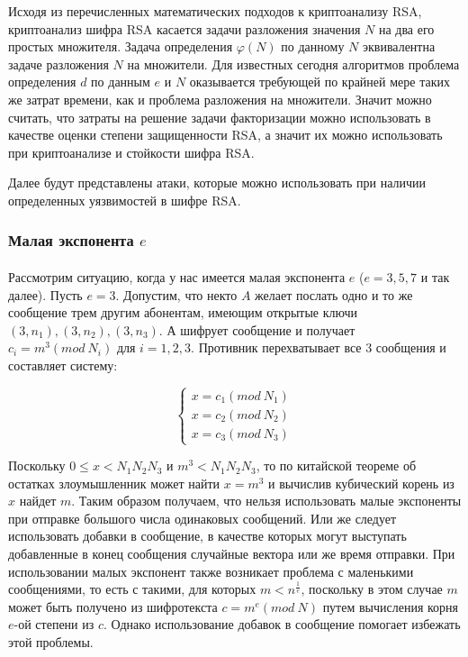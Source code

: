   Исходя из перечисленных математических подходов к криптоанализу RSA, криптоанализ шифра RSA касается задачи разложения значения $N$ на два его простых множителя. 
  Задача определения $\varphi(N)$ по данному $N$ эквивалентна задаче разложения $N$ на множители. Для известных сегодня алгоритмов
  проблема определения $d$ по данным $e$ и $N$ оказывается требующей по крайней мере таких же затрат времени, как и проблема разложения на 
  множители. Значит можно считать, что затраты на решение задачи факторизации можно использовать в качестве оценки степени защищенности RSA, а значит их можно использовать 
  при криптоанализе и стойкости шифра RSA.

  Далее будут представлены атаки, которые можно использовать при наличии определенных уязвимостей в шифре RSA. 

\subsubsection{Малая экспонента $e$}

  \paragraph{} Рассмотрим ситуацию, когда у нас имеется малая экспонента $e$ ($e = 3,5,7$ и так далее). Пусть $e=3$. Допустим, что некто
  $A$ желает послать одно и то же сообщение трем другим абонентам, имеющим открытые ключи $(3, n_1), (3, n_2), (3, n_3)$. А шифрует 
  сообщение и получает $c_i = m^3(mod \: N_i)$ для $i = 1, 2, 3$. Противник перехватывает все 3 сообщения и составляет систему:
  
    \begin{equation}
    	\begin{cases}
    	   x = c_1(mod \: N_1) \\
    	   x = c_2(mod \: N_2) \\
    	   x = c_3(mod \: N_3)
    	\end{cases}    
    \end{equation}

  Поскольку $0 \le x < N_1 N_2 N_3$ и $m^3 < N_1 N_2 N_3$, то по китайской теореме об остатках злоумышленник может найти 
  $x = m^3$ и вычислив кубический корень из $x$ найдет $m$. Таким образом получаем, что нельзя использовать малые экспоненты 
  при отправке большого числа одинаковых сообщений. Или же следует использовать добавки в сообщение, в качестве которых могут выступать добавленные в 
  конец сообщения случайные вектора или же время отправки. При использовании малых экспонент также возникает проблема с маленькими сообщениями, то есть 
  с такими, для которых $m < n^{\frac{1}{e}}$, поскольку в этом случае $m$ может быть получено из шифротекста 
  $c = m^e(mod \: N)$ путем вычисления корня $e$-ой степени из $c$. Однако использование добавок в сообщение помогает избежать этой 
  проблемы.

